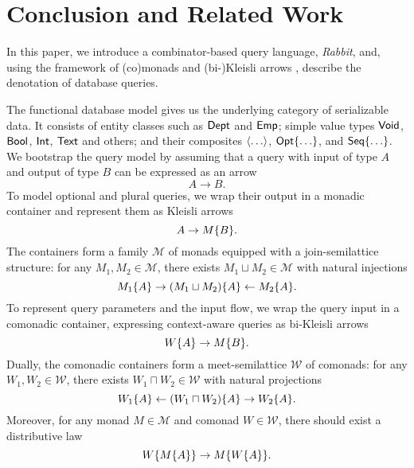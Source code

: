 
\section{Conclusion and Related Work}
\label{sec:conclusion}

In this paper, we introduce a combinator-based query language, \emph{Rabbit},
and, using the framework of (co)monads and (bi-)Kleisli arrows \cite{Moggi1991,
Uustalu2005}, describe the denotation of database queries.

The functional database model gives us the underlying category of serializable
data.  It consists of entity classes such as $\mathsf{Dept}$ and $\mathsf{Emp}$; simple value
types $\mathsf{Void}$, $\mathsf{Bool}$, $\mathsf{Int}$, $\mathsf{Text}$ and others; and their composites
$\langle \ldots \rangle$, $\mathsf{Opt}{\left\{\ldots\right\}}$, and $\mathsf{Seq}{\left\{\ldots\right\}}$.  We bootstrap the query
model by assuming that a query with input of type $A$ and output of type $B$
can be expressed as an arrow
\begin{equation*}
    A \to B.
\end{equation*}
To model optional and plural queries, we wrap their output in a monadic
container and represent them as Kleisli arrows
\begin{equation*}
    A \to M{\left\{B\right\}}.
\end{equation*}
The containers form a family $\mathcal{M}$ of monads equipped with a
join-semilattice structure: for any $M_1, M_2 \in \mathcal{M}$, there exists
$M_1 \sqcup M_2 \in \mathcal{M}$ with natural injections
\begin{equation*}
    M_1{\left\{A\right\}} \rightarrow (M_1 \sqcup M_2){\left\{A\right\}} \leftarrow M_2{\left\{A\right\}}.
\end{equation*}
To represent query parameters and the input flow, we wrap the query input in a
comonadic container, expressing context-aware queries as bi-Kleisli arrows
\begin{equation*}
    W{\left\{A\right\}} \to M{\left\{B\right\}}.
\end{equation*}
Dually, the comonadic containers form a meet-semi\-lat\-tice $\mathcal{W}$ of
comonads: for any $W_1, W_2 \in \mathcal{W}$, there exists
$W_1 \sqcap W_2 \in \mathcal{W}$ with natural projections
\begin{equation*}
    W_1{\left\{A\right\}} \leftarrow (W_1 \sqcap W_2)\{A\} \rightarrow W_2{\left\{A\right\}}.
\end{equation*}
Moreover, for any monad $M\in\mathcal{M}$ and comonad $W\in\mathcal{W}$, there
should exist a distributive law
\begin{equation*}
    W{\left\{M{\left\{A\right\}}\right\}} \to M{\left\{W{\left\{A\right\}}\right\}}.
\end{equation*}
